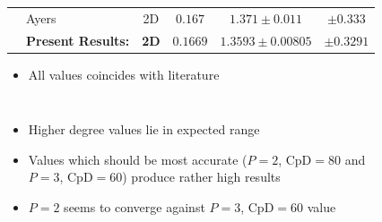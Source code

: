 \begin{frame}[allowframebreaks]
{\begin{minipage}{\the\textwidth}
\begin{table}[htp]
\begin{tabular}{|l|l|c|c|c|c|}
					\rule{0pt}{2,3ex}& Ayers                  & 2D    &$ 0.167$     & $1.371 \pm 0.011 $ &$ \pm 0.333 $\\ \cline{2-6} 
					\rule{0pt}{2,3ex}& \textbf{Present Results:}                   & \textbf{2D}    & $\mathbf{0.1669}$     & $\mathbf{1.3593 \pm 0.00805}$  &  $\mathbf{\pm 0.3291}$ \\ \hline
				\end{tabular}	
			\end{table}
				\end{minipage}
			}
			\vspace{-0.1cm}
			\begin{itemize}
				\item All values coincides with literature
			\end{itemize}
%			
			\begin{columns}[t]
				\column[]{5cm}
				\begin{itemize}
					\item Higher degree values lie in expected range
					\item Values which should be most accurate ($P=2$, $\text{CpD}=80$ and $P=3$, $\text{CpD}=60$) produce rather high results
					\item $P=2$ seems to converge against $P=3$, $\text{CpD}=60$ value
				\end{itemize}
				\column[]{7cm}
				\begin{figure}[htp]
					\centering		
					
				\end{figure}
			\end{columns}
			
		\end{frame}
